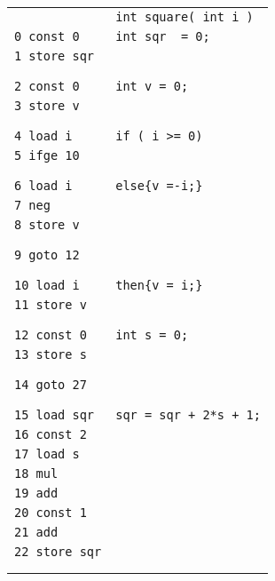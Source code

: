  \begin{figure}[ht!]
\begin{frameit}
  \scriptsize{
  \begin{tabular}{ll}
& \lstinline!int square( int i )!\\
\lstinline!0 const 0!      & \lstinline!int sqr  = 0;! \\
\lstinline!1 store sqr!	   & \\
                           & \\ & \\

\lstinline!2 const 0!      & \lstinline!int v = 0;! \\
\lstinline!3 store v!	   & \\
                           & \\ & \\

\lstinline!4 load i!       & \lstinline!if ( i >= 0)! \\ 
\lstinline!5 ifge 10!	   & \\
 & \\ & \\
\lstinline!6 load i!       & \Myspace \lstinline!else{v =-i;}! \\ 
\lstinline!7 neg!	   & \\
\lstinline!8 store v!	   & \\
                           & \\ & \\
\lstinline!9 goto 12!	   & \\ 

                           & \\ & \\
\lstinline!10 load i!	   &\Myspace \lstinline!then{v = i;}! \\ 
\lstinline!11 store v!	   & \\  
                           & \\ & \\
\lstinline!12 const 0!	   & \lstinline!int s = 0;! \\
\lstinline!13 store s!	   & \\ 
                           & \\ & \\
\lstinline!14 goto 27!	   & \\ 
	                   & \\ & \\
\lstinline!15 load sqr!      &\Myspace \lstinline!sqr = sqr + 2*s + 1;! \\ 
\lstinline!16 const 2!	   & \\ 
\lstinline!17 load s!	   & \\ 
\lstinline!18 mul!	   & \\        
\lstinline!19 add!	   & \\ 
\lstinline!20 const 1!	   & \\ 
\lstinline!21 add!	   & \\ 
\lstinline!22 store sqr!   & \\ 
                           & \\ & \\


\end{tabular}}
\end{frameit}
\end{figure}
